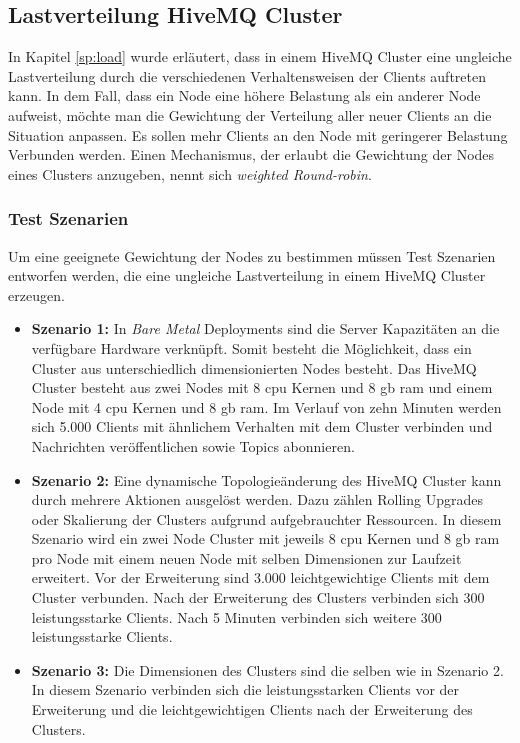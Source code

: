 \subsection{Lastverteilung HiveMQ Cluster}

In Kapitel \ref{sp:load} wurde erläutert, dass in einem HiveMQ Cluster eine ungleiche Lastverteilung durch die verschiedenen Verhaltensweisen der Clients auftreten kann.
In dem Fall, dass ein Node eine höhere Belastung als ein anderer Node aufweist, möchte man die Gewichtung der Verteilung aller neuer Clients an die Situation anpassen. Es sollen mehr Clients an den Node mit geringerer Belastung Verbunden werden.
Einen Mechanismus, der erlaubt die Gewichtung der Nodes eines Clusters anzugeben, nennt sich \textit{weighted Round-robin}.

\subsubsection{Test Szenarien} \label{ss:test}
Um eine geeignete Gewichtung der Nodes zu bestimmen müssen Test Szenarien entworfen werden, die eine ungleiche Lastverteilung in einem HiveMQ Cluster erzeugen.

\begin{itemize}
  \item \textbf{Szenario 1:} In \textit{Bare Metal} Deployments sind die Server Kapazitäten an die verfügbare Hardware verknüpft. Somit besteht die Möglichkeit, dass ein Cluster aus unterschiedlich dimensionierten Nodes besteht. Das HiveMQ Cluster besteht aus zwei Nodes mit 8 \ac{cpu} Kernen und 8 \ac{gb} \ac{ram} und einem Node mit 4 \ac{cpu} Kernen und 8 \ac{gb} \ac{ram}. Im Verlauf von zehn Minuten werden sich 5.000 Clients mit ähnlichem Verhalten mit dem Cluster verbinden und Nachrichten veröffentlichen sowie Topics abonnieren.
  \item \textbf{Szenario 2:} Eine dynamische Topologieänderung des HiveMQ Cluster kann durch mehrere Aktionen ausgelöst werden. Dazu zählen Rolling Upgrades oder Skalierung der Clusters aufgrund aufgebrauchter Ressourcen. In diesem Szenario wird ein zwei Node Cluster mit jeweils 8 \ac{cpu} Kernen und 8 \ac{gb} \ac{ram} pro Node mit einem neuen Node mit selben Dimensionen zur Laufzeit erweitert. Vor der Erweiterung sind 3.000 leichtgewichtige Clients mit dem Cluster verbunden. Nach der Erweiterung des Clusters verbinden sich 300 leistungsstarke Clients. Nach 5 Minuten verbinden sich weitere 300 leistungsstarke Clients.
  \item \textbf{Szenario 3:} Die Dimensionen des Clusters sind die selben wie in Szenario 2. In diesem Szenario verbinden sich die leistungsstarken Clients vor der Erweiterung und die leichtgewichtigen Clients nach der Erweiterung des Clusters.
\end{itemize}

